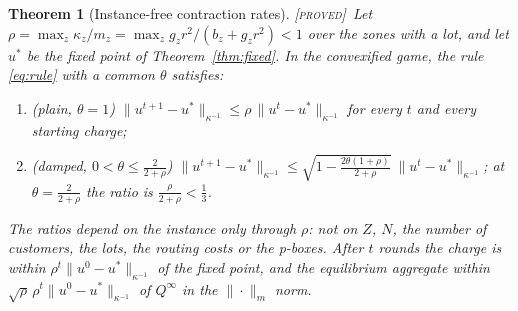 \documentclass[11pt]{article}
\newtheorem{theorem}{Theorem}
\theoremstyle{definition}
\theoremstyle{remark}
\newcommand{\norm}[2]{\|#1\|_{#2}}
\newcommand{\PROVED}{{\normalfont\textsc{[proved]}}}
\begin{document}
\begin{theorem}[Instance-free contraction rates]\label{thm:rate}\PROVED\
Let $\rho=\max_z\kappa_z/m_z=\max_zg_zr^2/(b_z+g_zr^2)<1$ over the zones with a lot, and let $u^*$ be the fixed point of Theorem~\ref{thm:fixed}. In the convexified game, the rule \eqref{eq:rule} with a common $\theta$ satisfies:
\begin{enumerate}[label=(\alph*)]
\item \emph{(plain, $\theta=1$)} $\norm{u^{t+1}-u^*}{\kappa^{-1}}\le\rho\,\norm{u^t-u^*}{\kappa^{-1}}$ for every $t$ and every starting charge;
\item \emph{(damped, $0<\theta\le\frac{2}{2+\rho}$)} $\norm{u^{t+1}-u^*}{\kappa^{-1}}\le\sqrt{1-\tfrac{2\theta(1+\rho)}{2+\rho}}\ \norm{u^t-u^*}{\kappa^{-1}}$; at $\theta=\frac{2}{2+\rho}$ the ratio is $\frac{\rho}{2+\rho}<\frac13$.
\end{enumerate}
The ratios depend on the instance only through $\rho$: not on $Z$, $N$, the number of customers, the lots, the routing costs or the p-boxes. After $t$ rounds the charge is within $\rho^t\norm{u^0-u^*}{\kappa^{-1}}$ of the fixed point, and the equilibrium aggregate within $\sqrt{\rho}\,\rho^t\norm{u^0-u^*}{\kappa^{-1}}$ of $Q^\infty$ in the $\norm{\cdot}{m}$ norm.
\end{theorem}
\end{document}
